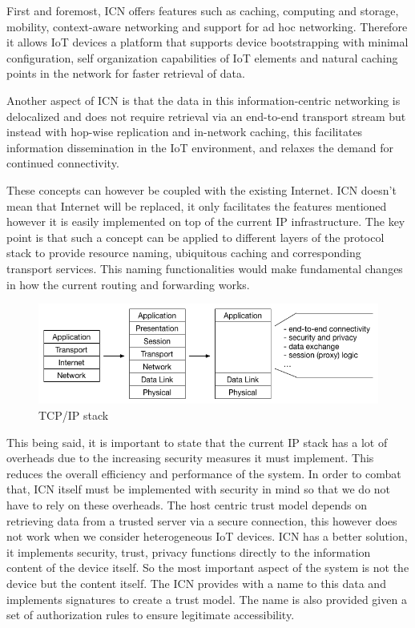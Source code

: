 First and foremost,  ICN offers features such as caching, computing and storage, mobility, context-aware networking and support for ad hoc networking. Therefore it allows IoT devices a platform that supports device bootstrapping with minimal configuration, self organization capabilities of IoT elements and natural caching points in the network for faster retrieval of data.\par
Another aspect of ICN is that the data in this information-centric networking is delocalized and does not require retrieval via an end-to-end transport stream but instead with hop-wise replication and in-network caching, this facilitates information dissemination in the IoT environment, and relaxes the demand for continued connectivity.\par
These concepts can however be coupled with the existing Internet. ICN doesn't mean that Internet will be replaced, it only facilitates the features mentioned however it is easily implemented on top of the current IP infrastructure. The key point is that such a concept can be applied to different layers of the protocol stack to provide resource naming, ubiquitous caching and corresponding transport services. This naming functionalities would make fundamental changes in how the current routing and forwarding works.\par
 \begin{figure}[ht]
	\centering
	\includegraphics[width=0.8\linewidth]{Figures/tcpstack.png}
	\caption[]{TCP/IP stack}
	\label{fig:TCP/IP stack}
\end{figure}
This being said, it is important to state that the current IP stack has a lot of overheads due to the increasing security measures it must implement. This reduces the overall efficiency and performance of the system. In order to combat that, ICN itself must be implemented with security in mind so that we do not have to rely on these overheads. The host centric trust model depends on retrieving data from a trusted server via a secure connection, this however does not work when we consider heterogeneous IoT devices. ICN has a better solution, it implements security, trust, privacy functions directly to the information content of the device itself. So the most important aspect of the system is not the device but the content itself. The ICN provides with a name to this data and implements signatures to create a trust model. The name is also provided given a set of authorization rules to ensure legitimate accessibility. \par
